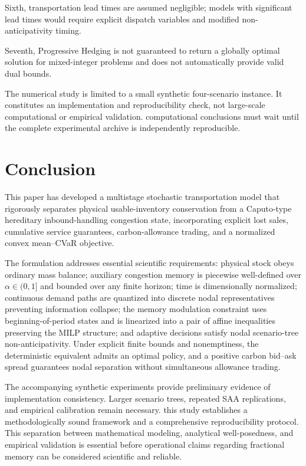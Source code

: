 \documentclass[11pt,a4paper]{article}
\begin{document}
Sixth, transportation lead times are assumed negligible; models with
significant lead times would require explicit dispatch variables and
modified non-anticipativity timing.

Seventh, Progressive Hedging is not guaranteed to return a globally
optimal solution for mixed-integer problems and does not automatically
provide valid dual bounds.

The numerical study is limited to a small synthetic four-scenario instance. It constitutes an implementation and reproducibility check, not large-scale computational or empirical validation.
computational conclusions must wait until the complete experimental
archive is independently reproducible.

\section{Conclusion}
\label{sec:conclusion}

This paper has developed a multistage stochastic transportation model
that rigorously separates physical usable-inventory conservation from a
Caputo-type hereditary inbound-handling congestion state, incorporating
explicit lost sales, cumulative service guarantees, carbon-allowance
trading, and a normalized convex mean--CVaR objective.

The formulation addresses essential scientific requirements: physical
stock obeys ordinary mass balance; auxiliary congestion memory is
piecewise well-defined over \(\alpha\in(0,1]\) and bounded over any
finite horizon;
time is dimensionally normalized; continuous demand paths are quantized
into discrete nodal representatives preventing information collapse;
the memory modulation constraint uses beginning-of-period states and is
linearized into a pair of affine inequalities preserving the MILP
structure; and adaptive decisions satisfy nodal scenario-tree
non-anticipativity. Under explicit finite bounds and nonemptiness, the
deterministic equivalent admits an optimal policy, and a positive carbon
bid--ask spread guarantees nodal separation without simultaneous
allowance trading.

The accompanying synthetic experiments provide preliminary evidence of implementation consistency. Larger scenario trees, repeated SAA replications, and empirical calibration remain necessary. this study
establishes a methodologically sound framework and a comprehensive
reproducibility protocol. This separation between mathematical modeling,
analytical well-posedness, and empirical validation is essential before
operational claims regarding fractional memory can be considered
scientific and reliable.




\end{document}
